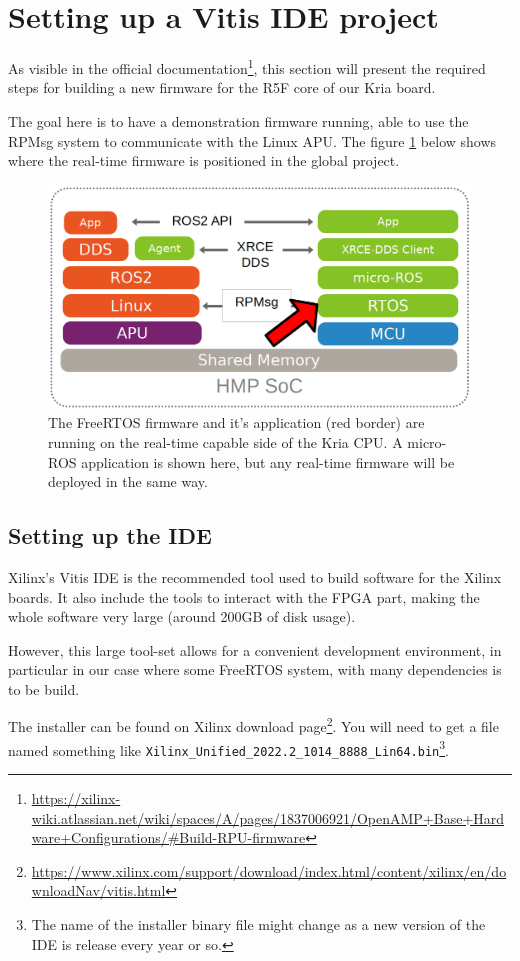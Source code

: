 \documentclass[10pt]{article}
\begin{document}
\section{Setting up a Vitis IDE project}
\label{sec:orga3a70e3}
As visible in the official documentation\footnote{\url{https://xilinx-wiki.atlassian.net/wiki/spaces/A/pages/1837006921/OpenAMP+Base+Hardware+Configurations/\#Build-RPU-firmware}}, this section will present the required
steps for building a new firmware for the R5F core of our Kria board.

The goal here is to have a demonstration firmware running,
able to use the RPMsg system to communicate with the Linux APU.
The figure \ref{fig:org4dba639} below shows where the real-time firmware
is positioned in the global project.

\begin{figure}[htbp]
\centering
\includegraphics[width=.6\textwidth]{./img/map_microros.png}
\caption{\label{fig:org4dba639}The FreeRTOS firmware and it's application (red border) are running on the real-time capable side of the Kria CPU. A micro-ROS application is shown here, but any real-time firmware will be deployed in the same way.}
\end{figure}

\subsection{Setting up the IDE}
\label{sec:org8498b7b}
Xilinx's Vitis IDE is the recommended tool used to build software for the Xilinx boards.
It also include the tools to interact with the FPGA part, making the whole
software very large (around 200GB of disk usage).

However, this large tool-set allows for a convenient development environment, in particular
in our case where some FreeRTOS system, with many dependencies is to be build.

The installer can be found on Xilinx download page\footnote{\url{https://www.xilinx.com/support/download/index.html/content/xilinx/en/downloadNav/vitis.html}}. You will need to get
a file named something like \texttt{Xilinx\_Unified\_2022.2\_1014\_8888\_Lin64.bin}\footnote{The name of the installer binary file might change as a new version of
the IDE is release every year or so.}.
\end{document}

